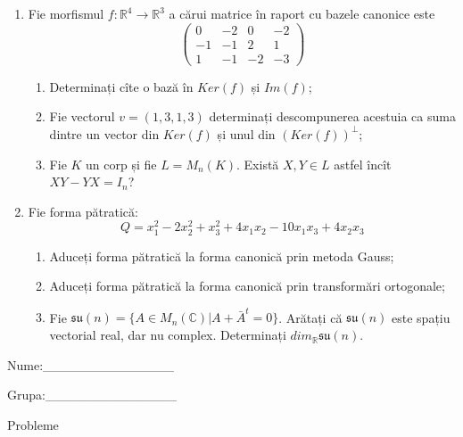 \documentclass{article}
\begin{document}
\begin{enumerate}
 \item Fie morfismul $f:\mathbb{R}^4 \to \mathbb{R}^3$ a cărui matrice în raport cu bazele canonice este
$$\begin{pmatrix}
0&-2&0&-2\\
-1&-1&2&1\\
1&-1&-2&-3
\end{pmatrix}$$

\begin{enumerate}
\item Determinați cîte o bază în $Ker(f)$ și $Im(f)$;
\item Fie vectorul $v=(1,3,1,3)$ determinați descompunerea acestuia ca suma dintre un vector din $Ker(f)$ și unul din $(Ker(f))^\perp$;
\item Fie $K$ un corp și fie $L=M_n(K)$. Există $X,Y \in L$ astfel încît $XY-YX=I_n$?  
\end{enumerate}
\item Fie forma pătratică:
$$Q= x_1^2-2x_2^2+x_3^2+4x_1x_2-10x_1x_3+4x_2x_3$$

\begin{enumerate}
\item Aduceți forma pătratică la forma canonică prin metoda Gauss;
\item Aduceți forma pătratică la forma canonică prin transformări ortogonale;
\item Fie $\mathfrak{su}(n)=\{ A \in M_n(\mathbb{C}) | A+\bar{A}^t=0\}$. Arătați că $\mathfrak{su}(n)$ este spațiu vectorial real, dar nu complex.
Determinați $dim_{\mathbb{R}}\mathfrak{su}(n)$.
\end{enumerate}
\end{enumerate}
\newpage
\begin{flushright}
Nume:\_\_\_\_\_\_\_\_\_\_\_\_\_\_
 
 
Grupa:\_\_\_\_\_\_\_\_\_\_\_\_\_\_
\end{flushright}
\begin{center}
\vspace{2cm}
{\Large Probleme}
\vspace{2cm}
\end{center}
\end{document}
